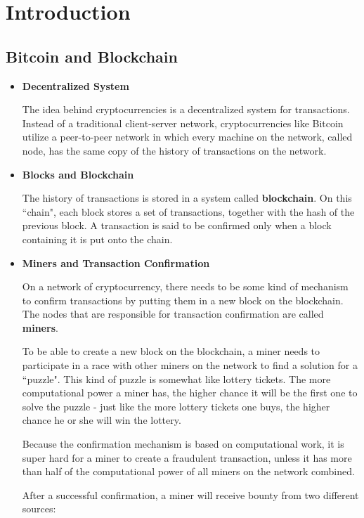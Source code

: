 \section{Introduction}
  \subsection{Bitcoin and Blockchain}
  \begin{itemize}
    \item \textbf{Decentralized System}
      \par The idea behind cryptocurrencies is a decentralized system for transactions. Instead of a traditional client-server network, cryptocurrencies like Bitcoin utilize a peer-to-peer network in which every machine on the network, called node, has the same copy of the history of transactions on the network.
    \item \textbf{Blocks and Blockchain}
      \par The history of transactions is stored in a system called \textbf{blockchain}. On this ``chain", each block stores a set of transactions, together with the hash of the previous block. A transaction is said to be confirmed only when a block containing it is put onto the chain.
    \item \textbf{Miners and Transaction Confirmation}
      \par On a network of cryptocurrency, there needs to be some kind of mechanism to confirm transactions by putting them in a new block on the blockchain. The nodes that are responsible for transaction confirmation are called \textbf{miners}.
      \par To be able to create a new block on the blockchain, a miner needs to participate in a race with other miners on the network to find a solution for a ``puzzle". This kind of puzzle is somewhat like lottery tickets. The more computational power a miner has, the higher chance it will be the first one to solve the puzzle - just like the more lottery tickets one buys, the higher chance he or she will win the lottery.
      \par Because the confirmation mechanism is based on computational work, it is super hard for a miner to create a fraudulent transaction, unless it has more than half of the computational power of all miners on the network combined.
      \par After a successful confirmation, a miner will receive bounty from two different sources:
      \begin{itemize}

\end{itemize}
\end{itemize}
